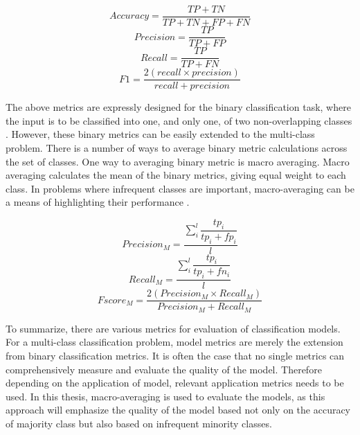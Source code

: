 \begin{equation}Accuracy = \dfrac{TP + TN}{TP+TN+FP+FN}\end{equation} 
\begin{equation}Precision = \dfrac{TP}{TP+FP}\end{equation} 
\begin{equation}Recall = \dfrac{TP}{TP+FN}\end{equation} 
\begin{equation}F1 = \dfrac{2 (recall \times precision) }{recall+precision}\end{equation} 

The above metrics are expressly designed for the binary classification task, where the input is to be classified into one, and only one, of two non-overlapping classes \citep{sokolova2009systematic}. However, these binary metrics can be easily extended to the multi-class problem. There is a number of ways to average binary metric calculations across the set of classes. One way to averaging binary metric is macro averaging. Macro averaging calculates the mean of the binary metrics, giving equal weight to each class. In problems where infrequent classes are important, macro-averaging can be a means of highlighting their performance \citep{scikit-learn}.

\begin{equation}Precision_M =  \dfrac{\sum^l_i\dfrac{tp_i}{tp_i+fp_i}}{l} \end{equation} 
\begin{equation}Recall_M =  \dfrac{\sum^l_i\dfrac{tp_i}{tp_i+fn_i}}{l} \end{equation} 
\begin{equation}Fscore_M =  \dfrac{2 (Precision_M \times Recall_M) }{Precision_M+Recall_M }\end{equation}

To summarize, there are various metrics for evaluation of classification models. For a multi-class classification problem, model metrics are merely the extension from binary classification metrics. It is often the case that no single metrics can comprehensively measure and evaluate the quality of the model. Therefore depending on the application of model, relevant application metrics needs to be used. In this thesis, macro-averaging is used to evaluate the models, as this approach will emphasize the quality of the model based not only on the accuracy of majority class but also based on infrequent minority classes.

